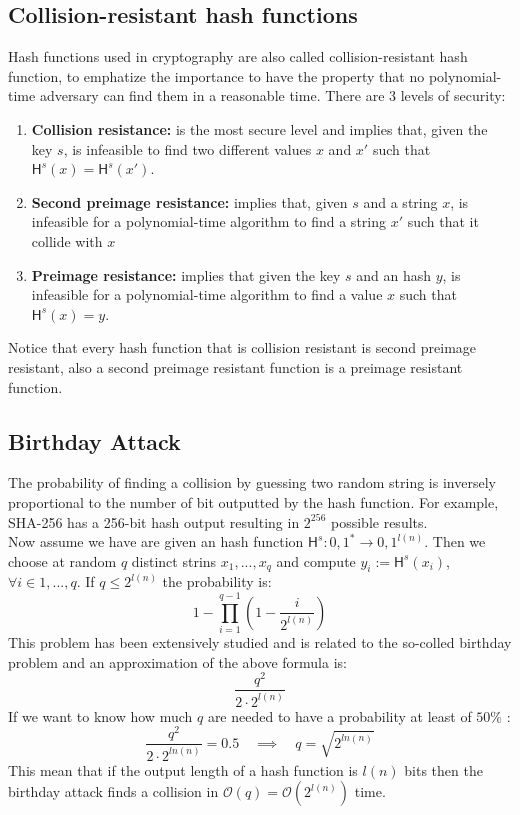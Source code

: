 \subsection{Collision-resistant hash functions}
Hash functions used in cryptography are also called collision-resistant hash function, to emphatize the importance to have the property that no polynomial-time adversary can find them in a reasonable time.
There are 3 levels of security:
\begin{enumerate}
    \item{\textbf{Collision resistance:} is the most secure level and implies that, given the key $s$, is infeasible to find two different values $x$ and $x'$ such that $\mathsf{H}^s(x) = \mathsf{H}^s(x')$.}
    \item{\textbf{Second preimage resistance:} implies that, given $s$ and a string $x$, is infeasible for a polynomial-time algorithm to find a string $x'$ such that it collide with $x$}
    \item{\textbf{Preimage resistance:} implies that given the key $s$ and an hash $y$, is infeasible for a polynomial-time algorithm to find a value $x$ such that $\mathsf{H}^s(x) = y$.}
\end{enumerate}
Notice that every hash function that is collision resistant is second preimage resistant, also a second preimage resistant function is a preimage resistant function.\\

\subsection{Birthday Attack}
The probability of finding a collision by guessing two random string is inversely proportional to the number of bit outputted by the hash function. For example, SHA-256 has a 256-bit hash output resulting in $2^{256}$ possible results.\\
Now assume we have are given an hash function $\mathsf{H}^s : {0,1}^{*} \rightarrow {0,1}^{l(n)}$. Then we choose at random $q$ distinct strins $x_1,...,x_q$ and compute $y_i := \mathsf{H}^s(x_i)$, $\forall i \in {1,...,q}$. If $q \leq 2^{l(n)}$ the probability is:
$$
    1 - \prod_{i = 1}^{q-1} (1 - \frac{i}{2^{l(n)}})
$$
This problem has been extensively studied and is related to the so-colled birthday problem and an approximation of the above formula is:
$$
    \frac{q^2}{2\cdot2^{l(n)}}
$$
If we want to know how much $q$ are needed to have a probability at least of $50\%$ :
$$
    \frac{q^2}{2\cdot2^{ln(n)}} = 0.5
    \quad \implies \quad
    q = \sqrt{2^{ln(n)}}
$$
This mean that if the output length of a hash function is $l(n)$ bits then the birthday attack finds a collision in $\mathcal{O}(q) = \mathcal{O}(2^{l(n)})$ time.\\
